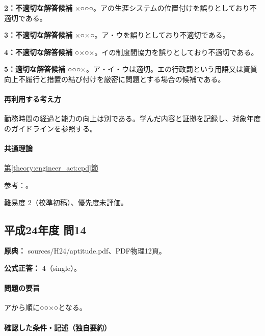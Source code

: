 \noindent\textbf{2：不適切な解答候補} ×○○○。アの生涯システムの位置付けを誤りとしており不適切である。\par

\noindent\textbf{3：不適切な解答候補} ×○×○。ア・ウを誤りとしており不適切である。\par

\noindent\textbf{4：不適切な解答候補} ○×○×。イの制度間協力を誤りとしており不適切である。\par

\noindent\textbf{5：適切な解答候補} ○○○×。ア・イ・ウは適切。エの行政罰という用語又は資質向上不履行と措置の結び付けを厳密に問題とする場合の候補である。\par

\paragraph{再利用する考え方} 勤務時間の経過と能力の向上は別である。学んだ内容と証拠を記録し、対象年度のガイドラインを参照する。

\paragraph{共通理論} \hyperref[theory:engineer_act:cpd]{第\ref*{theory:engineer_act:cpd}節}

\par 参考：\cite{engineer_act_current,cpd_v1}。

\par 難易度 2（校準初稿）、優先度未評価。

\subsection{平成24年度 問14}
\label{q:h24-reg-apt-14}

\noindent\textbf{原典：} sources/H24/aptitude.pdf、PDF物理12頁。

\textbf{公式正答：} 4（single）。

\paragraph{問題の要旨} アから順に○○×○となる。

\paragraph{確認した条件・記述（独自要約）}\mbox{}\par


